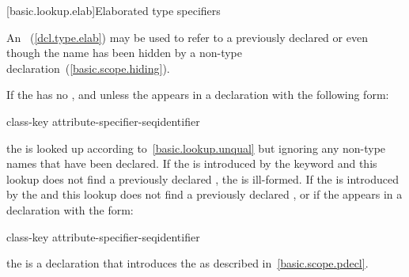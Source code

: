 [basic.lookup.elab]{Elaborated type specifiers}%
%

\pnum
An ~(\ref{dcl.type.elab}) may be
used to refer to a previously declared  or
 even though the name has been hidden by a non-type
declaration~(\ref{basic.scope.hiding}).

\pnum
If the  has no
, and unless the
 appears in a declaration with the
following form:

\begin{ncbnf}
class-key attribute-specifier-seq\opt identifier \terminal{;}
\end{ncbnf}

the  is looked up according
to~\ref{basic.lookup.unqual} but ignoring any non-type names that have
been declared. If the  is introduced
by the  keyword and this lookup does not find a previously
declared , the 
is ill-formed. If the  is introduced
by the  and this lookup does not find a previously
declared , or if the
 appears in a declaration with the
form:

\begin{ncbnf}
class-key attribute-specifier-seq\opt identifier \terminal{;}
\end{ncbnf}

the  is a declaration that
introduces the  as described
in~\ref{basic.scope.pdecl}.

